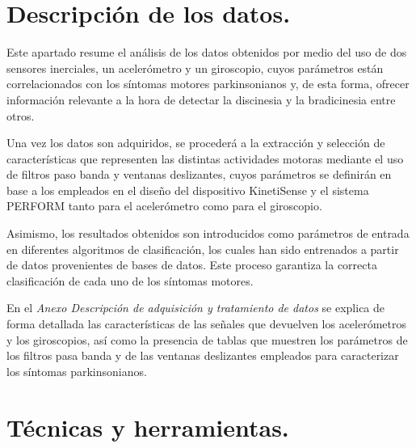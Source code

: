 
\section{Descripción de los datos.}

Este apartado resume el análisis de los datos obtenidos por medio del uso de dos sensores inerciales, un acelerómetro y un giroscopio, cuyos parámetros están correlacionados con los síntomas motores parkinsonianos y, de esta forma, ofrecer información relevante a la hora de detectar la discinesia y la bradicinesia entre otros. 

Una vez los datos son adquiridos, se procederá a la extracción y selección de características que representen las distintas actividades motoras mediante el uso de filtros paso banda y ventanas deslizantes, cuyos parámetros se definirán en base a los empleados en el diseño del dispositivo KinetiSense \cite{mera2013quantitative} y el sistema PERFORM \cite{tzallas2014perform} tanto para el acelerómetro como para el giroscopio. 

Asimismo, los resultados obtenidos son introducidos como parámetros de entrada en diferentes algoritmos de clasificación, los cuales han sido entrenados a partir de datos provenientes de bases de datos. Este proceso garantiza la correcta clasificación de cada uno de los síntomas motores.


En el \textit{Anexo Descripción de adquisición y tratamiento de datos} se explica de forma detallada las características de las señales que devuelven los acelerómetros y los giroscopios, así como la presencia de tablas que muestren los parámetros de los filtros pasa banda y de las ventanas deslizantes empleados para caracterizar los síntomas parkinsonianos. 

 
\section{Técnicas y herramientas.}



